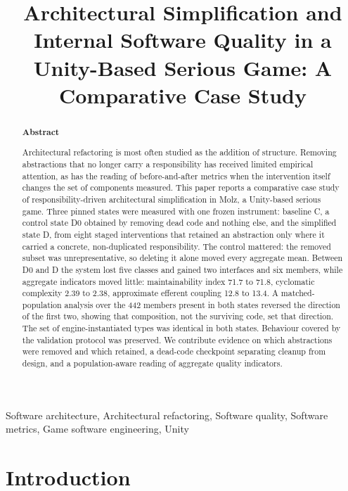 \documentclass{sbc2019}%
\title[Architectural Simplification and Internal Software Quality]{Architectural Simplification and Internal Software Quality in a Unity-Based Serious Game: A Comparative Case Study}
\author[Rezende and Rocha 2026]{\affil{\textbf{Jo\~ao Guilherme Benjamin Alves de Rezende}\quad[~\textbf{Universidade Federal do Agreste de Pernambuco~}|\href{mailto:benj7100@gmail.com}{~\textbf{\textit{benj7100@gmail.com}}} ]}

\affil{\textbf{Rodrigo Gusm\~ao de Carvalho Rocha}\quad[~\textbf{Universidade Federal do Agreste de Pernambuco~}|\href{mailto:rodrigo.rocha@ufape.edu.br}{~\textbf{\textit{rodrigo.rocha@ufape.edu.br}}} ]}
}
\begin{document}
\begin{frontmatter}
\maketitle

\begin{abstract}
\textbf{Abstract}

Architectural refactoring is most often studied as the addition of structure. Removing abstractions that no longer carry a responsibility has received limited empirical attention, as has the reading of before-and-after metrics when the intervention itself changes the set of components measured. This paper reports a comparative case study of responsibility-driven architectural simplification in Molz, a Unity-based serious game. Three pinned states were measured with one frozen instrument: baseline C, a control state D0 obtained by removing dead code and nothing else, and the simplified state D, from eight staged interventions that retained an abstraction only where it carried a concrete, non-duplicated responsibility. The control mattered: the removed subset was unrepresentative, so deleting it alone moved every aggregate mean. Between D0 and D the system lost five classes and gained two interfaces and six members, while aggregate indicators moved little: maintainability index 71.7 to 71.8, cyclomatic complexity 2.39 to 2.38, approximate efferent coupling 12.8 to 13.4. A matched-population analysis over the 442 members present in both states reversed the direction of the first two, showing that composition, not the surviving code, set that direction. The set of engine-instantiated types was identical in both states. Behaviour covered by the validation protocol was preserved. We contribute evidence on which abstractions were removed and which retained, a dead-code checkpoint separating cleanup from design, and a population-aware reading of aggregate quality indicators.
\end{abstract}

\begin{keywords}
Software architecture, Architectural refactoring, Software quality, Software metrics, Game software engineering, Unity
\end{keywords}

\end{frontmatter}


\section{Introduction}
\end{document}
